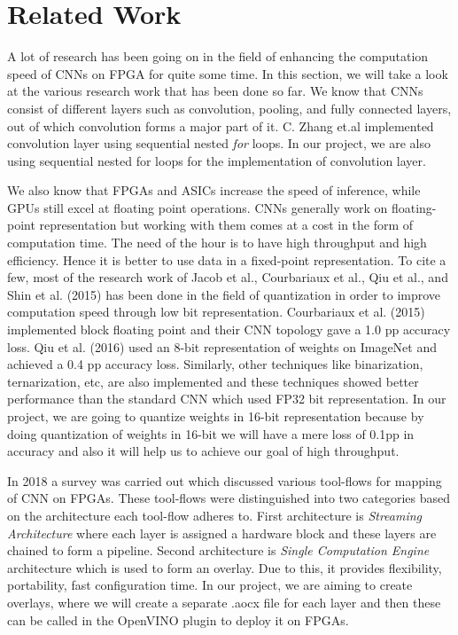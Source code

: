 \documentclass[titlepage]{report}
\begin{document}

\chapter{Related Work}
A lot of research has been going on in the field of enhancing the computation speed of CNNs on FPGA for quite some time. In this section, we will take a look at the various research work that has been done so far. We know that CNNs consist of different layers such as convolution, pooling, and fully connected layers, out of which convolution forms a major part of it. C. Zhang et.al implemented convolution layer using sequential nested \textit{for} loops. In our project, we are also using sequential nested for loops for the implementation of convolution layer.

We also know that FPGAs and ASICs increase the speed of inference, while GPUs still excel at floating point operations. CNNs generally work on floating-point representation but working with them comes at a cost in the form of computation time. The need of the hour is to have high throughput and high efficiency. Hence it is better to use data in a fixed-point representation. To cite a few, most of the research work of Jacob et al., Courbariaux et al., Qiu et al., and Shin et al. (2015) has been done in the field of quantization in order to improve computation speed through low bit representation. Courbariaux et al. (2015) implemented block floating point and their CNN topology gave a 1.0 pp accuracy loss. Qiu et al. (2016) used an 8-bit representation of weights on ImageNet and achieved a 0.4 pp accuracy loss. Similarly, other techniques like binarization, ternarization, etc, are also implemented and these techniques showed better performance than the standard CNN which used FP32 bit representation. In our project, we are going to quantize weights in 16-bit representation because by doing quantization of weights in 16-bit we will have a mere loss of 0.1pp in accuracy and also it will help us to achieve our goal of high throughput.

In 2018 a survey was carried out which discussed various tool-flows for mapping of CNN on FPGAs. These tool-flows were distinguished into two categories based on the architecture each tool-flow adheres to. First architecture is \textit{Streaming Architecture} where each layer is assigned a hardware block and these layers are chained to form a pipeline. Second architecture is \textit{Single Computation Engine} architecture which is used to form an overlay. Due to this, it provides flexibility, portability, fast configuration time. In our project, we are aiming to create overlays, where we will create a separate .aocx file for each layer and then these can be called in the OpenVINO plugin to deploy it on FPGAs.
\end{document}

